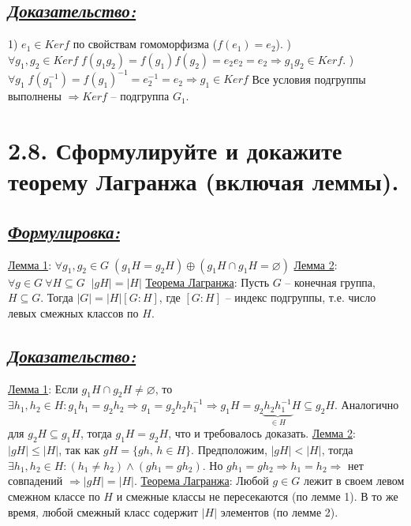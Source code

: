 \documentclass{article}
\begin{document}
\subsection*{\Large \underline{\textit{Доказательство: }}}
1) $e_1 \in Kerf$ по свойствам гомоморфизма ($f(e_1) = e_2$).
) $\forall g_1, g_2 \in Kerf \; f(g_1g_2) = f(g_1)f(g_2) = e_2e_2 = e_2 \Rightarrow g_1g_2 \in Kerf$.
) $\forall g_1 \; f(g_1^{-1}) = f(g_1)^{-1} = e_2^{-1} = e_2 \Rightarrow g_{1} \in Kerf$
\newline Все условия подгруппы выполнены $\Rightarrow Kerf$ -- подгруппа $G_1$.

\section*{\LARGE 2.8. Сформулируйте и докажите теорему Лагранжа (включая леммы).}
\subsection*{\Large \underline{\textit{Формулировка: }}}
\underline{Лемма 1}:
\newline $\forall g_1, g_2 \in G \; (g_1H = g_2H) \oplus (g_1H \cap g_1H = \varnothing)$
\newline \underline{Лемма 2}:
\newline $\forall g \in G \: \forall H \subseteq G \;\; |gH| = |H|$
\newline \underline{Теорема Лагранжа}:
\newline Пусть $G$ -- конечная группа, $H \subseteq G$. Тогда $|G| = |H|[G : H]$, где $[G : H]$ -- индекс подгруппы, т.е. число левых смежных классов по $H$.

\subsection*{\Large \underline{\textit{Доказательство: }}}
\underline{Лемма 1}:
\newline Если $g_1H \cap g_2H \ne \varnothing$, то $\exists h_1, h_2 \in H : g_1h_1 = g_2h_2 \Rightarrow g_1 = g_2h_2h_1^{-1} \Rightarrow g_1H = g_2\underbrace{h_2h_1^{-1}}_{\in H}H \subseteq g_2H$. Аналогично для $g_2H \subseteq g_1H$, тогда $g_1H = g_2H$, что и требовалось доказать.
\newline \underline{Лемма 2}:
\newline $|gH| \le |H|$, так как $gH = \{gh,\, h \in H\}$. Предположим, $|gH| < |H|$, тогда $\exists h_1, h_2 \in H : (h_1 \ne h_2)\wedge(gh_1 = gh_2)$. Но $gh_1 = gh_2 \Rightarrow h_1 = h_2 \Rightarrow$ нет совпадений $\Rightarrow |gH| = |H|$.
\newline \underline{Теорема Лагранжа}:
\newline Любой $g \in G$ лежит в своем левом смежном классе по $H$ и смежные классы не пересекаются (по лемме 1). В то же время, любой смежный класс содержит $|H|$ элементов (по лемме 2).
\end{document}
